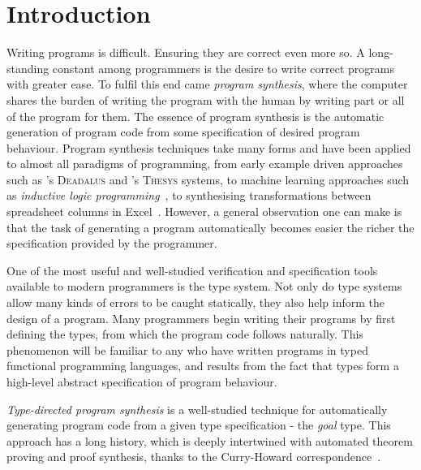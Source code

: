 \chapter{Introduction}
\label{chapter:intro}
Writing programs is difficult. Ensuring they are correct even more so. A
long-standing constant among programmers is the desire to write correct programs
with greater ease. To fulfil this end came \emph{program synthesis}, where the
computer shares the burden of writing the program with the human by writing part
or all of the program for them. The essence of program synthesis is the
automatic generation of program code from some specification of desired program
behaviour. Program synthesis techniques take many forms and have been applied to
almost all paradigms of programming, from early example driven approaches such
as \citet{deadalus}'s \textsc{Deadalus} and \citet{10.1145/321992.322002}'s \textsc{Thesys} systems, to
machine learning approaches such as \textit{inductive logic
programming}~\citep{MUGGLETON1994629}, to synthesising transformations between
spreadsheet columns in Excel~\citep{flashfill}. However, a general observation
one can make is that the task of generating a program automatically becomes
easier the richer the specification provided by the programmer. 

One of the most useful and well-studied verification and specification tools
available to modern programmers is the type system. Not only do type systems
allow many kinds of errors to be caught statically, they also help inform the
design of a program. Many programmers begin writing their programs by first
defining the types, from which the program code follows naturally. This
phenomenon will be familiar to any who have written programs in typed functional
programming languages, and results from the fact that types form a high-level
abstract specification of program behaviour. 

\emph{Type-directed program synthesis} is a well-studied technique for automatically
generating program code from a given type specification - the \textit{goal}
type. This approach has a long history, which is deeply intertwined with
automated theorem proving and proof synthesis, thanks to the Curry-Howard
correspondence~\citep{manna1980deductive,10.5555/1624562.1624585}. 

